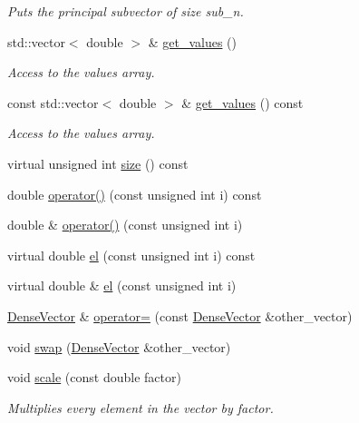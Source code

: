 \begin{DoxyCompactItemize}
\begin{DoxyCompactList}\small\item\em Puts the principal subvector of size {\ttfamily sub\+\_\+n}. \end{DoxyCompactList}\item 
std\+::vector$<$ double $>$ \& \mbox{\hyperlink{classfemus_1_1_dense_vector_acf34d5982e06da4191d60fe823e16332}{get\+\_\+values}} ()
\begin{DoxyCompactList}\small\item\em Access to the values array. \end{DoxyCompactList}\item 
const std\+::vector$<$ double $>$ \& \mbox{\hyperlink{classfemus_1_1_dense_vector_ab8b7707faa7fe4818ecdac02296e15ea}{get\+\_\+values}} () const
\begin{DoxyCompactList}\small\item\em Access to the values array. \end{DoxyCompactList}\item 
virtual unsigned int \mbox{\hyperlink{classfemus_1_1_dense_vector_ac7d42a76bf12cb82076b8c7444cbc9ee}{size}} () const
\item 
double \mbox{\hyperlink{classfemus_1_1_dense_vector_a53d9ad849428e8fbec174fa14a76b525}{operator()}} (const unsigned int i) const
\item 
double \& \mbox{\hyperlink{classfemus_1_1_dense_vector_a6e2f6d28cb5ddff856e68ac265c9214c}{operator()}} (const unsigned int i)
\item 
virtual double \mbox{\hyperlink{classfemus_1_1_dense_vector_aff2ffaa4a8b334a0c913fa0d79223e30}{el}} (const unsigned int i) const
\item 
virtual double \& \mbox{\hyperlink{classfemus_1_1_dense_vector_abee121241acbc2d29a7e54fc27588357}{el}} (const unsigned int i)
\item 
\mbox{\hyperlink{classfemus_1_1_dense_vector}{Dense\+Vector}} \& \mbox{\hyperlink{classfemus_1_1_dense_vector_a6fb17b0b5c1af6bb8be9075254e61866}{operator=}} (const \mbox{\hyperlink{classfemus_1_1_dense_vector}{Dense\+Vector}} \&other\+\_\+vector)
\item 
void \mbox{\hyperlink{classfemus_1_1_dense_vector_a95404c4c657691d8e4b719d08e7820c1}{swap}} (\mbox{\hyperlink{classfemus_1_1_dense_vector}{Dense\+Vector}} \&other\+\_\+vector)
\item 
void \mbox{\hyperlink{classfemus_1_1_dense_vector_a06413e6b8d637592452444a5141927e6}{scale}} (const double factor)
\begin{DoxyCompactList}\small\item\em Multiplies every element in the vector by {\ttfamily factor}. \end{DoxyCompactList}\item 

\end{DoxyCompactItemize}
